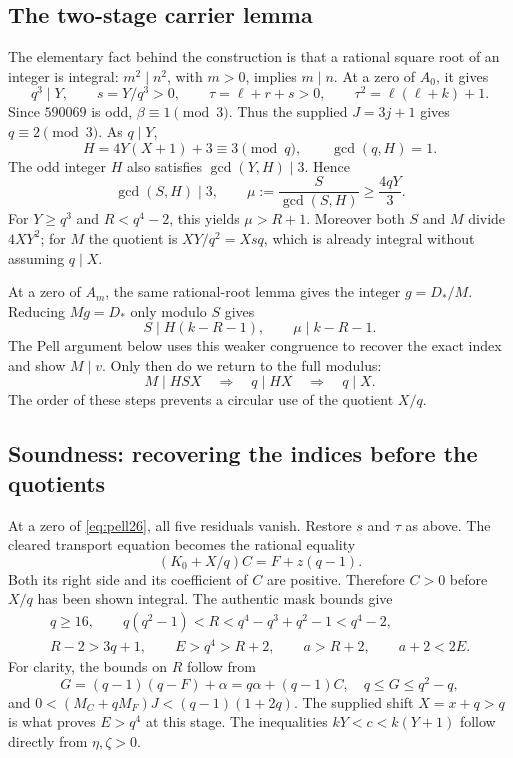\subsection{The two-stage carrier lemma}

The elementary fact behind the construction is that a rational square root
of an integer is integral: $m^2\mid n^2$, with $m>0$, implies $m\mid n$.
At a zero of $A_0$, it gives
\[
 q^3\mid Y,\qquad s=Y/q^3>0,\qquad
 \tau=\ell+r+s>0,\qquad \tau^2=\ell(\ell+k)+1.
\]
Since $590069$ is odd, $\beta\equiv1\pmod3$. Thus the supplied
$J=3j+1$ gives $q\equiv2\pmod3$. As $q\mid Y$,
\[
 H=4Y(X+1)+3\equiv3\pmod q,
 \qquad \gcd(q,H)=1.
\]
The odd integer $H$ also satisfies $\gcd(Y,H)\mid3$. Hence
\begin{equation}
 \gcd(S,H)\mid3,\qquad
 \mu:=\frac S{\gcd(S,H)}\ge\frac{4qY}{3}.
 \label{eq:pell-mu}
\end{equation}
For $Y\ge q^3$ and $R<q^4-2$, this yields $\mu>R+1$.
Moreover both $S$ and $M$ divide $4XY^2$; for $M$ the quotient is
$XY/q^2=Xsq$, which is already integral without assuming $q\mid X$.

At a zero of $A_m$, the same rational-root lemma gives the integer
$g=D_*/M$. Reducing $Mg=D_*$ only modulo $S$ gives
\begin{equation}
 S\mid H(k-R-1),\qquad \mu\mid k-R-1.
 \label{eq:pell-weak}
\end{equation}
The Pell argument below uses this weaker congruence to recover the exact
index and show $M\mid v$. Only then do we return to the full modulus:
\begin{equation}
 M\mid HSX\quad\Longrightarrow\quad q\mid HX
       \quad\Longrightarrow\quad q\mid X.
 \label{eq:pell-strongdiv}
\end{equation}
The order of these steps prevents a circular use of the quotient $X/q$.

\subsection{Soundness: recovering the indices before the quotients}

At a zero of \eqref{eq:pell26}, all five residuals vanish. Restore $s$ and
$\tau$ as above. The cleared transport equation becomes the rational
equality
\[
 (K_0+X/q)C=F+z(q-1).
\]
Both its right side and its coefficient of $C$ are positive. Therefore
$C>0$ before $X/q$ has been shown integral. The authentic mask bounds give
\begin{gather}
 q\ge16,\qquad q(q^2-1)<R<q^4-q^3+q^2-1<q^4-2,\label{eq:pell-bounds}\\
 R-2>3q+1,\qquad E>q^4>R+2,\qquad a>R+2,
 \qquad a+2<2E.\nonumber
\end{gather}
For clarity, the bounds on $R$ follow from
\[
 G=(q-1)(q-F)+\alpha=q\alpha+(q-1)C,
 \quad q\le G\le q^2-q,
\]
and $0<(M_C+qM_F)J<(q-1)(1+2q)$. The supplied shift $X=x+q>q$
is what proves $E>q^4$ at this stage. The inequalities
$kY<c<k(Y+1)$ follow directly from $\eta,\zeta>0$.

